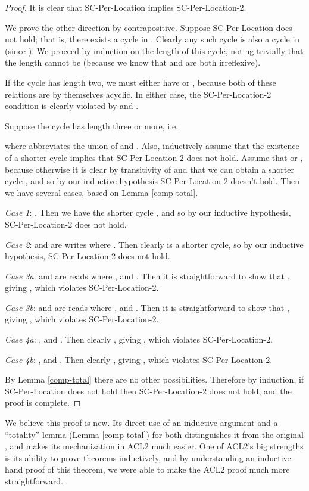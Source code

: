 \documentclass[]{eptcs}
\begin{document}
\begin{proof}
It is clear that SC-Per-Location implies SC-Per-Location-2.

We prove the other direction by contrapositive. Suppose SC-Per-Location does not hold; that is, there exists a cycle in . Clearly any such cycle is also a cycle in  (since ). We proceed by induction on the length of this cycle, noting trivially that the length cannot be  (because we know that  and  are both irreflexive).

If the cycle has length two, we must either have  or , because both of these relations are by themselves acyclic. In either case, the SC-Per-Location-2 condition is clearly violated by  and .

Suppose the cycle has length three or more, i.e.

where  abbreviates the union of  and . Also, inductively assume that the existence of a shorter cycle implies that SC-Per-Location-2 does not hold. Assume that  or , because otherwise it is clear by transitivity of  and  that we can obtain a shorter cycle , and so by our inductive hypothesis SC-Per-Location-2 doesn't hold. Then we have several cases, based on Lemma \ref{comp-total}.

\emph{Case 1}: . Then we have the shorter cycle , and so by our inductive hypothesis, SC-Per-Location-2 does not hold.

\emph{Case 2}:  and  are writes where . Then clearly  is a shorter cycle, so by our inductive hypothesis, SC-Per-Location-2 does not hold.

\emph{Case 3a}:  and  are reads where , and . Then it is straightforward to show that , giving , which violates SC-Per-Location-2.

\emph{Case 3b}:  and  are reads where , and . Then it is straightforward to show that , giving , which violates SC-Per-Location-2.

\emph{Case 4a}: , and . Then clearly , giving , which violates SC-Per-Location-2.

\emph{Case 4b}: , and . Then clearly , giving , which violates SC-Per-Location-2.

By Lemma \ref{comp-total} there are no other possibilities. Therefore by induction, if SC-Per-Location does not hold then SC-Per-Location-2 does not hold, and the proof is complete.
\end{proof}

We believe this proof is new. Its direct use of an inductive argument and a ``totality'' lemma (Lemma \ref{comp-total}) for  both distinguishes it from the original \cite{alglave_thesis}, and makes its mechanization in ACL2 much easier. One of ACL2's big strengths is its ability to prove theorems inductively, and by understanding an inductive hand proof of this theorem, we were able to make the ACL2 proof much more straightforward.
\end{document}
